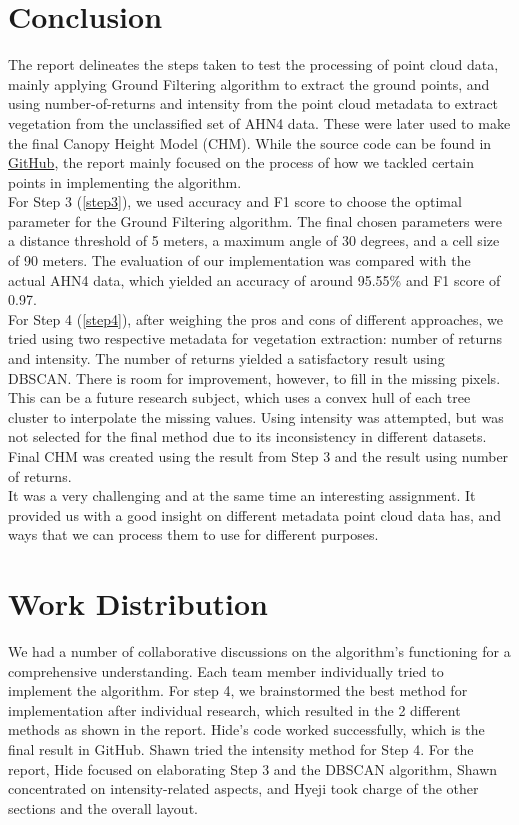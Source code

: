 \documentclass{article}
\begin{document}
\section{Conclusion}
The report delineates the steps taken to test the processing of point cloud data, mainly applying Ground Filtering algorithm to extract the ground points, and using number-of-returns and intensity from the point cloud metadata to extract vegetation from the unclassified set of AHN4 data. These were later used to make the final Canopy Height Model (CHM). While the source code can be found in \href{https://github.com/HideBa/geo1015-ass4-team-bbq}{GitHub}, the report mainly focused on the process of how we tackled certain points in implementing the algorithm.\\

\noindent For Step 3 (\ref{step3}), we used accuracy and F1 score to choose the optimal parameter for the Ground Filtering algorithm. The final chosen parameters were a distance threshold of 5 meters, a maximum angle of 30 degrees, and a cell size of 90 meters. The evaluation of our implementation was compared with the actual AHN4 data, which yielded an accuracy of around 95.55\% and F1 score of 0.97.\\

\noindent For Step 4 (\ref{step4}), after weighing the pros and cons of different approaches, we tried using two respective metadata for vegetation extraction: number of returns and intensity. The number of returns yielded a satisfactory result using DBSCAN. There is room for improvement, however, to fill in the missing pixels. This can be a future research subject, which uses a convex hull of each tree cluster to interpolate the missing values. Using intensity was attempted, but was not selected for the final method due to its inconsistency in different datasets. Final CHM was created using the result from Step 3 and the result using number of returns.\\ 

\noindent It was a very challenging and at the same time an interesting assignment. It provided us with a good insight on different metadata point cloud data has, and ways that we can process them to use for different purposes. 


\section{Work Distribution}
We had a number of collaborative discussions on the algorithm's functioning for a comprehensive understanding. Each team member individually tried to implement the algorithm. For step 4, we brainstormed the best method for implementation after individual research, which resulted in the 2 different methods as shown in the report. Hide's code worked successfully, which is the final result in GitHub. Shawn tried the intensity method for Step 4. For the report, Hide focused on elaborating Step 3 and the DBSCAN algorithm, Shawn concentrated on intensity-related aspects, and Hyeji took charge of the other sections and the overall layout. 
\clearpage
\end{document}
